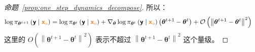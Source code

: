 \documentclass[citestyle=gb7714-2015, bibstyle=gb7714-2015,lang=cn,14pt,scheme=chinese]{elegantbook}
\begin{document}
\begin{proof}[命题~\ref{prop:one_step_dynamics_decompose}]
所以：
\begin{equation}\label{eq:SGD-learning_dynamic_taylor_expansion_bigO}
\begin{aligned}
    \log \pi_{\bm{\theta}^{t+1}} \left( \bm{\mathsf{y}} \mid \textcolor{orange}{\bm{\mathsf{x}}_{o}} \right) &= \log \pi_{\bm{\theta}^{t}} \left( \bm{\mathsf{y}} \mid \textcolor{orange}{\bm{\mathsf{x}}_{o}} \right) + \nabla_{\bm{\theta}} \log \pi_{\bm{\theta}^{t}} \left( \bm{\mathsf{y}} \mid \textcolor{orange}{\bm{\mathsf{x}}_{o}} \right) \left( \bm{\theta}^{t+1} - \bm{\theta}^{t} \right) + \mathcal{O} \left( \left\| \bm{\theta}^{t+1} - \bm{\theta}^{t} \right\|^{2} \right)
\end{aligned}
\end{equation}
这里的 \(O \left( \left\| \bm{\theta}^{t+1} - \bm{\theta}^{t} \right\|^{2} \right)\) 表示不超过 \(\left\| \bm{\theta}^{t+1} - \bm{\theta}^{t} \right\|^{2}\) 这个量级。


\end{proof}
\end{document}
